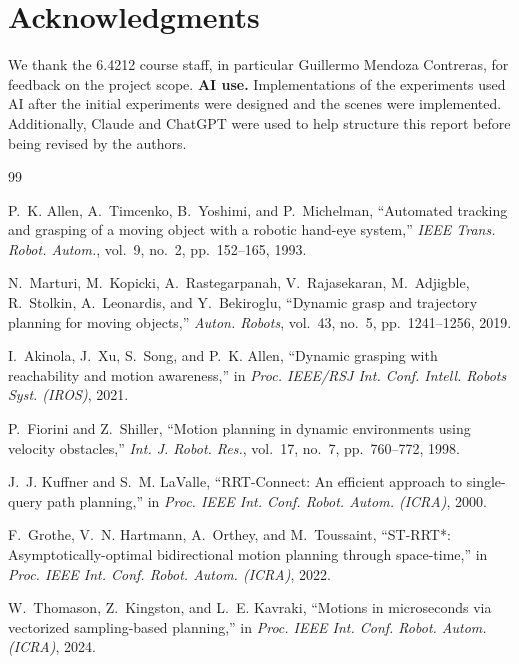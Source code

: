 \documentclass[conference]{IEEEtran}
\begin{document}
\section*{Acknowledgments}

We thank the 6.4212 course staff, in particular Guillermo Mendoza Contreras, for feedback on the project
scope. \textbf{AI use.} Implementations of the experiments used AI after the initial experiments were designed and the scenes were implemented. Additionally, Claude and ChatGPT were used to help structure this report before being revised by the authors.

\begin{thebibliography}{99}

P.~K. Allen, A.~Timcenko, B.~Yoshimi, and P.~Michelman, ``Automated tracking and grasping of a moving
object with a robotic hand-eye system,'' \emph{IEEE Trans. Robot. Autom.}, vol.~9, no.~2, pp.~152--165,
1993.

N.~Marturi, M.~Kopicki, A.~Rastegarpanah, V.~Rajasekaran, M.~Adjigble, R.~Stolkin, A.~Leonardis, and
Y.~Bekiroglu, ``Dynamic grasp and trajectory planning for moving objects,'' \emph{Auton. Robots},
vol.~43, no.~5, pp.~1241--1256, 2019.

I.~Akinola, J.~Xu, S.~Song, and P.~K. Allen, ``Dynamic grasping with reachability and motion
awareness,'' in \emph{Proc. IEEE/RSJ Int. Conf. Intell. Robots Syst. (IROS)}, 2021.

P.~Fiorini and Z.~Shiller, ``Motion planning in dynamic environments using velocity obstacles,''
\emph{Int. J. Robot. Res.}, vol.~17, no.~7, pp.~760--772, 1998.

J.~J. Kuffner and S.~M. LaValle, ``RRT-Connect: An efficient approach to single-query path planning,'' in
\emph{Proc. IEEE Int. Conf. Robot. Autom. (ICRA)}, 2000.

F.~Grothe, V.~N. Hartmann, A.~Orthey, and M.~Toussaint, ``ST-RRT*: Asymptotically-optimal bidirectional
motion planning through space-time,'' in \emph{Proc. IEEE Int. Conf. Robot. Autom. (ICRA)}, 2022.

W.~Thomason, Z.~Kingston, and L.~E. Kavraki, ``Motions in microseconds via vectorized sampling-based
planning,'' in \emph{Proc. IEEE Int. Conf. Robot. Autom. (ICRA)}, 2024.


\end{thebibliography}
\end{document}
